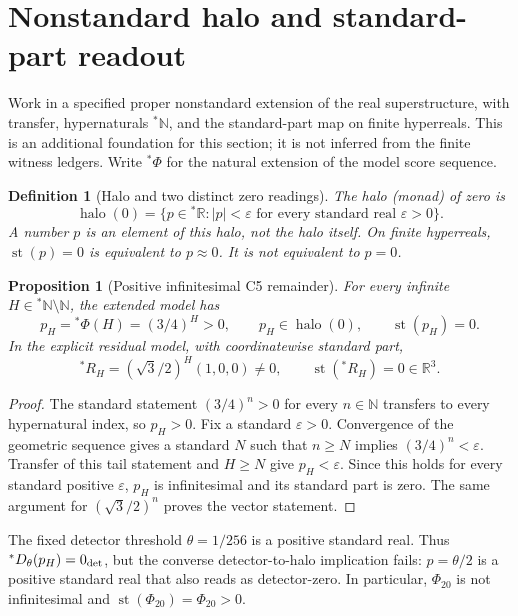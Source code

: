 \documentclass[11pt,a4paper]{article}
\newtheorem{definition}{Definition}
\newtheorem{proposition}{Proposition}
\begin{document}
\section{Nonstandard halo and standard-part readout}
Work in a specified proper nonstandard extension of the real superstructure,
with transfer, hypernaturals ${}^*\mathbb N$, and the standard-part map on
finite hyperreals. This is an additional foundation for this section;
it is not inferred from the finite witness ledgers. Write ${}^*\Phi$ for the
natural extension of the model score sequence.

\begin{definition}[Halo and two distinct zero readings]
The halo (monad) of zero is
\[
\operatorname{halo}(0)=
\{p\in{}^*\mathbb R: |p|<\varepsilon
\text{ for every standard real }\varepsilon>0\}.
\]
A number $p$ is an element of this halo, not the halo itself. On finite
hyperreals, $\operatorname{st}(p)=0$ is equivalent to $p\approx0$.
It is not equivalent to $p=0$.
\end{definition}

\begin{proposition}[Positive infinitesimal C5 remainder]
For every infinite $H\in{}^*\mathbb N\setminus\mathbb N$, the extended
model has
\[
p_H={}^*\Phi(H)=(3/4)^H>0,\qquad
p_H\in\operatorname{halo}(0),\qquad \operatorname{st}(p_H)=0.
\]
In the explicit residual model, with coordinatewise standard part,
\[
{}^*R_H=(\sqrt3/2)^H(1,0,0)\ne0,\qquad
\operatorname{st}({}^*R_H)=0\in\mathbb R^3.
\]
\end{proposition}
\begin{proof}
The standard statement $(3/4)^n>0$ for every $n\in\mathbb N$ transfers
to every hypernatural index, so $p_H>0$. Fix a standard $\varepsilon>0$.
Convergence of the geometric sequence gives a standard $N$ such that
$n\ge N$ implies $(3/4)^n<\varepsilon$. Transfer of this tail statement
and $H\ge N$ give $p_H<\varepsilon$. Since this holds for every standard
positive $\varepsilon$, $p_H$ is infinitesimal and its standard part is zero.
The same argument for $(\sqrt3/2)^n$ proves the vector statement.
\end{proof}

The fixed detector threshold $\theta=1/256$ is a positive standard real.
Thus ${}^*D_\theta(p_H)=0_{\rm det}$, but the converse detector-to-halo
implication fails: $p=\theta/2$ is a positive standard real that also reads
as detector-zero. In particular, $\Phi_{20}$ is not infinitesimal and
$\operatorname{st}(\Phi_{20})=\Phi_{20}>0$.
\end{document}
